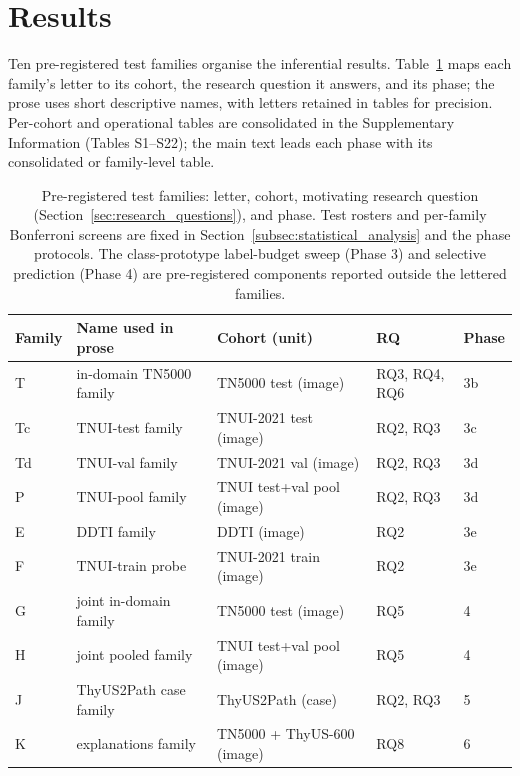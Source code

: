 \documentclass[jimh,article,submit,moreauthors,pdftex]{Definitions/tsp}
\begin{document}

\section{Results}\label{sec:results}

Ten pre-registered test families organise the inferential results.
Table~\ref{tab:test_families} maps each family's letter to its cohort,
the research question it answers, and its phase; the prose uses short
descriptive names, with letters retained in tables for precision.
Per-cohort and operational tables are consolidated in the Supplementary
Information (Tables S1--S22); the main text leads each phase with its
consolidated or family-level table.

\begin{table}[!ht]
\centering\small
\setlength{\tabcolsep}{4pt}
\caption{Pre-registered test families: letter, cohort, motivating
research question (Section~\ref{sec:research_questions}), and phase.
Test rosters and per-family Bonferroni screens are fixed in
Section~\ref{subsec:statistical_analysis} and the phase protocols. The
class-prototype label-budget sweep (Phase 3) and selective prediction
(Phase 4) are pre-registered components reported outside the lettered
families.}
\label{tab:test_families}
\begin{tabular}{lp{3.3cm}p{3.1cm}ll}
\toprule
Family & Name used in prose & Cohort (unit) & RQ & Phase \\
\midrule
T  & in-domain TN5000 family & TN5000 test (image) & RQ3, RQ4, RQ6 & 3b \\
Tc & TNUI-test family & TNUI-2021 test (image) & RQ2, RQ3 & 3c \\
Td & TNUI-val family & TNUI-2021 val (image) & RQ2, RQ3 & 3d \\
P  & TNUI-pool family & TNUI test+val pool (image) & RQ2, RQ3 & 3d \\
E  & DDTI family & DDTI (image) & RQ2 & 3e \\
F  & TNUI-train probe & TNUI-2021 train (image) & RQ2 & 3e \\
G  & joint in-domain family & TN5000 test (image) & RQ5 & 4 \\
H  & joint pooled family & TNUI test+val pool (image) & RQ5 & 4 \\
J  & ThyUS2Path case family & ThyUS2Path (case) & RQ2, RQ3 & 5 \\
K  & explanations family & TN5000 + ThyUS-600 (image) & RQ8 & 6 \\
\bottomrule
\end{tabular}
\end{table}
\end{document}
